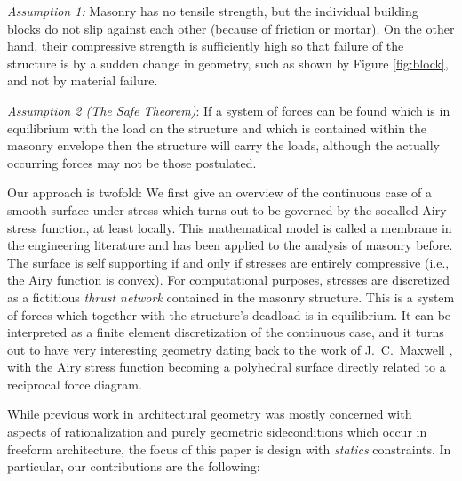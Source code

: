 \documentclass[review]{acmsiggraph}
\begin{document}
{\it Assumption 1:} Masonry has no tensile strength, but the individual 
building blocks do not slip against each other (because of friction or 
mortar). On the other hand, their compressive strength is sufficiently 
high so that failure of the structure is by a sudden change in geometry, 
such as shown by Figure \ref{fig:block}, and not by material failure.

{\it Assumption 2 (The Safe Theorem)}: If a system of forces can be found 
which is in equilibrium with the load on the structure and which is 
contained within the masonry envelope then the structure will carry the 
loads, although the actually occurring forces may not be those postulated.

Our approach is twofold: We first give an overview of the continuous case 
of a smooth surface under stress which turns out to be governed by the 
so\dash called Airy stress function, at least locally. This mathematical 
model is called a membrane in the engineering literature and has been 
applied to the analysis of masonry before. The surface is self\dash 
supporting if and only if stresses are entirely compressive (i.e., the 
Airy function is convex). For computational purposes, stresses are 
discretized as a fictitious {\em thrust network} \cite{Block07} contained 
in the masonry structure. This is a system of forces which together with 
the structure's deadload is in equilibrium. It can be interpreted as a 
finite element discretization of the continuous case, and it turns out to 
have very interesting geometry dating back to the work of J.\ C.\ Maxwell 
, with the Airy stress function becoming a polyhedral 
surface directly related to a reciprocal force diagram. 

While previous work in architectural geometry was mostly concerned
with aspects of rationalization and purely geometric side\dash conditions
which occur in freeform architecture, the focus of this paper is design with
{\em statics} constraints. In particular, our 
contributions are the following:
\end{document}

